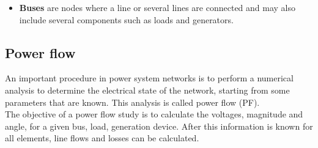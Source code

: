 \begin{itemize}
    \item \textbf{Buses} are nodes where a line or several lines are connected and may also include several components such as loads and generators.
\end{itemize}

\subsection{Power flow}
\label{powerflow}
An important procedure in power system networks is to perform a numerical analysis to determine the electrical state of the network, starting from some parameters that are known. This analysis is called power flow (\gls{PF}).\\
The objective of a power flow study is to calculate the voltages, magnitude and angle, for a given bus, load, generation device. After this information is known for all elements, line flows and losses can be calculated.

